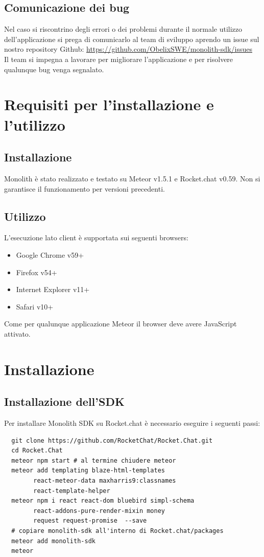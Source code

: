 \subsection{Comunicazione dei bug}
Nel caso si riscontrino degli errori o dei problemi durante il normale utilizzo dell'applicazione si prega di comunicarlo al team di sviluppo aprendo un issue sul nostro repository Github:
\url{https://github.com/ObelixSWE/monolith-sdk/issues} \\
Il team si impegna a lavorare per migliorare l'applicazione e per risolvere qualunque bug venga segnalato.

\section{Requisiti per l'installazione e l'utilizzo}
\subsection{Installazione}
Monolith è stato realizzato e testato su Meteor v1.5.1 e Rocket.chat v0.59. Non si garantisce il funzionamento per versioni precedenti.
\subsection{Utilizzo}
L'esecuzione lato client è supportata sui seguenti browsers:
\begin{itemize}
	\item Google Chrome v59+
	\item Firefox v54+
	\item Internet Explorer v11+
	\item Safari v10+
\end{itemize}
Come per qualunque applicazione Meteor il browser deve avere JavaScript attivato.

\section{Installazione}
\subsection{Installazione dell'SDK}
Per installare Monolith SDK su Rocket.chat è necessario eseguire i seguenti passi:
\begin{lstlisting}
  git clone https://github.com/RocketChat/Rocket.Chat.git
  cd Rocket.Chat
  meteor npm start # al termine chiudere meteor
  meteor add templating blaze-html-templates 
		react-meteor-data maxharris9:classnames
		react-template-helper	
  meteor npm i react react-dom bluebird simpl-schema 
  		react-addons-pure-render-mixin money 
  		request request-promise  --save
  # copiare monolith-sdk all'interno di Rocket.chat/packages
  meteor add monolith-sdk
  meteor
\end{lstlisting}

